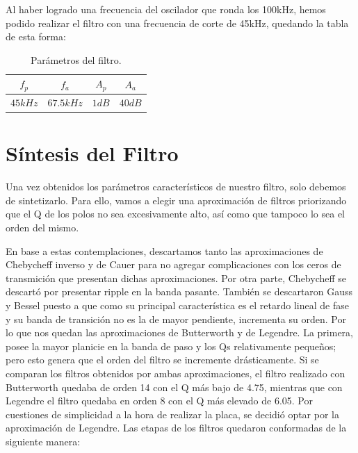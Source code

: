 \documentclass[../../ASSD_TP1_G7.tex]{subfiles}
\begin{document}
Al haber logrado una frecuencia del oscilador que ronda los 100kHz,
hemos podido realizar el filtro con una frecuencia de corte de 45kHz,
quedando la tabla de esta forma:

\begin{table}[H]

\begin{centering}
\begin{tabular}{|c|c|c|c|}
\hline 
$f_{p}$ & $f_{a}$ & $A_{p}$ & $A_{a}$\\
\hline 
\hline 
$45kHz$ & $67.5kHz$ & $1dB$ & $40dB$\\
\hline 
\end{tabular}\caption{Parámetros del filtro.}
\par\end{centering}
\end{table}


\section{Síntesis del Filtro}

Una vez obtenidos los parámetros característicos de nuestro filtro,
solo debemos de sintetizarlo. Para ello, vamos a elegir una aproximación
de filtros priorizando que el Q de los polos no sea excesivamente
alto, así como que tampoco lo sea el orden del mismo.

En base a estas contemplaciones, descartamos tanto las aproximaciones
de Chebycheff inverso y de Cauer para no agregar complicaciones con
los ceros de transmición que presentan dichas aproximaciones. Por
otra parte, Chebycheff se descartó por presentar ripple en la banda
pasante. También se descartaron Gauss y Bessel puesto a que como su
principal característica es el retardo lineal de fase y su banda de
transición no es la de mayor pendiente, incrementa su orden. Por lo
que nos quedan las aproximaciones de Butterworth y de Legendre. La
primera, posee la mayor planicie en la banda de paso y los Qs relativamente
pequeños; pero esto genera que el orden del filtro se incremente drásticamente.
Si se comparan los filtros obtenidos por ambas aproximaciones, el
filtro realizado con Butterworth quedaba de orden 14 con el Q más
bajo de 4.75, mientras que con Legendre el filtro quedaba en orden
8 con el Q más elevado de 6.05. Por cuestiones de simplicidad a la
hora de realizar la placa, se decidió optar por la aproximación de
Legendre. Las etapas de los filtros quedaron conformadas de la siguiente
manera:
\end{document}
